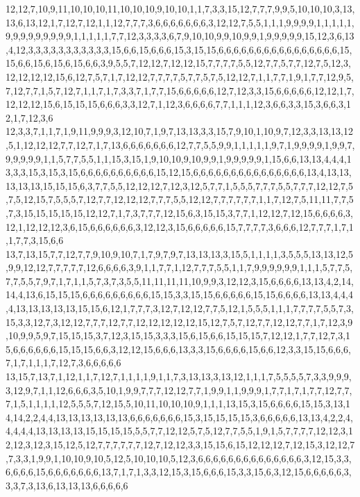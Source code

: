 12,12,7,10,9,11,10,10,10,11,10,10,10,9,10,10,1,1,7,3,3,15,12,7,7,7,9,9,5,10,10,10,3,13,13,6,13,12,1,7,12,7,12,1,1,12,7,7,7,3,6,6,6,6,6,6,6,3,12,12,7,5,5,1,1,1,9,9,9,9,1,1,1,1,1,9,9,9,9,9,9,9,9,9,1,1,1,1,1,7,7,12,3,3,3,3,6,7,9,10,10,9,9,10,9,9,1,9,9,9,9,9,15,12,3,6,13,4,12,3,3,3,3,3,3,3,3,3,3,3,15,6,6,15,6,6,6,15,3,15,15,6,6,6,6,6,6,6,6,6,6,6,6,6,6,6,6,15,15,6,6,15,6,15,6,15,6,6,3,9,5,5,7,12,12,7,12,12,15,7,7,7,7,5,5,12,7,7,5,7,7,12,7,5,12,3,12,12,12,12,15,6,12,7,5,7,1,7,12,12,7,7,7,7,5,7,7,5,7,5,12,12,7,1,1,7,7,1,9,1,7,7,12,9,5,7,12,7,7,1,5,7,12,7,1,1,7,1,7,3,3,7,1,7,7,15,6,6,6,6,6,12,7,12,3,3,15,6,6,6,6,6,12,12,1,7,12,12,12,15,6,15,15,15,6,6,6,3,3,12,7,1,12,3,6,6,6,6,7,7,1,1,1,12,3,6,6,3,3,15,3,6,6,3,12,1,7,12,3,6
12,3,3,7,1,1,7,1,9,11,9,9,9,3,12,10,7,1,9,7,13,13,3,3,15,7,9,10,1,10,9,7,12,3,3,13,13,12,5,1,12,12,12,7,7,12,7,1,7,13,6,6,6,6,6,6,6,12,7,7,5,5,9,9,1,1,1,1,1,9,7,1,9,9,9,9,1,9,9,7,9,9,9,9,9,1,1,5,7,7,5,5,1,1,15,3,15,1,9,10,10,9,10,9,9,1,9,9,9,9,9,1,15,6,6,13,13,4,4,4,13,3,3,15,3,15,3,15,6,6,6,6,6,6,6,6,6,6,15,12,15,6,6,6,6,6,6,6,6,6,6,6,6,6,6,6,13,4,13,13,13,13,13,15,15,15,6,3,7,7,5,5,12,12,12,7,12,3,12,5,7,7,1,5,5,5,7,7,7,5,5,7,7,7,12,12,7,5,7,5,12,15,7,5,5,5,7,12,7,7,12,12,12,7,7,7,5,5,12,12,7,7,7,7,7,7,1,1,7,12,7,5,11,11,7,7,5,7,3,15,15,15,15,15,12,12,7,1,7,3,7,7,7,12,15,6,3,15,15,3,7,7,1,12,12,7,12,15,6,6,6,6,3,12,1,12,12,12,3,6,15,6,6,6,6,6,6,3,12,12,3,15,6,6,6,6,6,15,7,7,7,7,3,6,6,6,12,7,7,7,1,7,1,1,7,7,3,15,6,6
13,7,13,15,7,7,12,7,7,9,10,9,10,7,1,7,9,7,9,7,13,13,13,3,15,5,1,1,1,1,3,5,5,5,13,13,12,5,9,9,12,12,7,7,7,7,7,12,6,6,6,6,3,9,1,1,7,7,1,12,7,7,7,5,5,1,1,7,9,9,9,9,9,9,1,1,1,5,7,7,5,7,7,5,5,7,9,7,1,7,1,1,5,7,3,7,3,5,5,11,11,11,11,10,9,9,3,12,12,3,15,6,6,6,6,13,13,4,2,14,14,4,13,6,15,15,15,6,6,6,6,6,6,6,6,6,15,15,3,3,15,15,6,6,6,6,6,15,15,6,6,6,6,13,13,4,4,4,4,13,13,13,13,13,15,15,6,12,1,7,7,7,3,12,7,12,12,7,7,5,12,1,5,5,5,1,1,1,7,7,7,7,5,5,7,3,15,3,3,12,7,3,12,12,7,7,7,12,7,7,12,12,12,12,12,15,12,7,5,7,12,7,7,12,12,7,7,1,7,12,3,9,10,9,9,5,9,7,15,15,15,3,7,12,3,15,15,3,3,3,15,6,15,6,6,15,15,15,7,12,12,1,7,7,12,7,3,15,6,6,6,6,6,6,15,15,15,6,6,3,12,12,15,6,6,6,13,3,3,15,6,6,6,6,15,6,6,12,3,3,15,15,6,6,6,7,1,7,1,1,1,7,12,7,3,6,6,6,6,6
13,15,7,13,7,1,12,1,1,7,12,7,1,1,1,1,9,1,1,7,3,13,13,3,13,12,1,1,1,7,5,5,5,5,7,3,3,9,9,9,3,12,9,7,1,1,12,6,6,6,3,5,10,1,9,9,7,7,7,12,12,7,7,1,9,9,1,1,9,9,9,1,7,7,1,7,1,7,7,12,7,7,7,1,5,1,1,1,1,12,5,5,5,7,12,15,5,10,11,10,10,10,9,1,1,1,13,15,3,15,6,6,6,6,15,15,3,13,14,14,2,2,4,4,13,13,13,13,13,13,6,6,6,6,6,6,6,15,3,15,15,15,15,3,6,6,6,6,6,13,13,4,2,2,4,4,4,4,4,13,13,13,13,15,15,15,15,5,5,7,7,12,12,5,7,5,12,7,7,5,5,1,9,1,5,7,7,7,7,12,12,3,12,12,3,12,3,15,12,5,12,7,7,7,7,7,7,12,7,12,12,3,3,15,15,6,15,12,12,12,7,12,15,3,12,12,7,7,3,3,1,9,9,1,10,10,9,10,5,12,5,10,10,10,5,12,3,6,6,6,6,6,6,6,6,6,6,6,6,6,6,3,12,15,3,3,6,6,6,6,15,6,6,6,6,6,6,6,13,7,1,7,1,3,3,12,15,3,15,6,6,6,15,3,3,15,6,3,12,15,6,6,6,6,6,3,3,3,7,3,13,6,13,13,13,6,6,6,6,6
